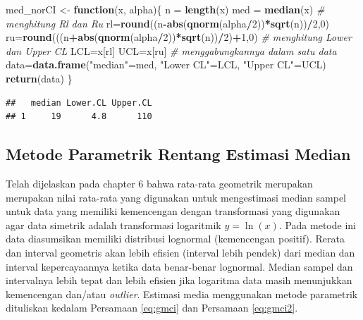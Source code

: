 \documentclass[]{book}
\newenvironment{Shaded}{\begin{snugshade}}{\end{snugshade}}
\newcommand{\KeywordTok}[1]{\textcolor[rgb]{0.13,0.29,0.53}{\textbf{#1}}}
\newcommand{\DataTypeTok}[1]{\textcolor[rgb]{0.13,0.29,0.53}{#1}}
\newcommand{\DecValTok}[1]{\textcolor[rgb]{0.00,0.00,0.81}{#1}}
\newcommand{\FloatTok}[1]{\textcolor[rgb]{0.00,0.00,0.81}{#1}}
\newcommand{\StringTok}[1]{\textcolor[rgb]{0.31,0.60,0.02}{#1}}
\newcommand{\CommentTok}[1]{\textcolor[rgb]{0.56,0.35,0.01}{\textit{#1}}}
\newcommand{\ControlFlowTok}[1]{\textcolor[rgb]{0.13,0.29,0.53}{\textbf{#1}}}
\newcommand{\OperatorTok}[1]{\textcolor[rgb]{0.81,0.36,0.00}{\textbf{#1}}}
\newcommand{\NormalTok}[1]{#1}
\begin{document}
\begin{Shaded}
\begin{Highlighting}[]
\NormalTok{med_norCI <-}\StringTok{ }\ControlFlowTok{function}\NormalTok{(x, alpha)\{}
\NormalTok{  n =}\StringTok{ }\KeywordTok{length}\NormalTok{(x)}
\NormalTok{  med =}\StringTok{ }\KeywordTok{median}\NormalTok{(x)}
  \CommentTok{# menghitung Rl dan Ru}
\NormalTok{  rl=}\KeywordTok{round}\NormalTok{((n}\OperatorTok{-}\KeywordTok{abs}\NormalTok{(}\KeywordTok{qnorm}\NormalTok{(alpha}\OperatorTok{/}\DecValTok{2}\NormalTok{))}\OperatorTok{*}\KeywordTok{sqrt}\NormalTok{(n))}\OperatorTok{/}\DecValTok{2}\NormalTok{,}\DecValTok{0}\NormalTok{)}
\NormalTok{  ru=}\KeywordTok{round}\NormalTok{(((n}\OperatorTok{+}\KeywordTok{abs}\NormalTok{(}\KeywordTok{qnorm}\NormalTok{(alpha}\OperatorTok{/}\DecValTok{2}\NormalTok{))}\OperatorTok{*}\KeywordTok{sqrt}\NormalTok{(n))}\OperatorTok{/}\DecValTok{2}\NormalTok{)}\OperatorTok{+}\DecValTok{1}\NormalTok{,}\DecValTok{0}\NormalTok{)}
  \CommentTok{# menghitung Lower dan Upper CL}
\NormalTok{  LCL=x[rl]}
\NormalTok{  UCL=x[ru]}
  \CommentTok{# menggabungkannya dalam satu data}
\NormalTok{  data=}\KeywordTok{data.frame}\NormalTok{(}\StringTok{"median"}\NormalTok{=med,}
                  \StringTok{"Lower CL"}\NormalTok{=LCL,}
                  \StringTok{"Upper CL"}\NormalTok{=UCL)}
  \KeywordTok{return}\NormalTok{(data)}
\NormalTok{\}}
\end{Highlighting}
\end{Shaded}

\begin{Shaded}
\end{Shaded}

\begin{verbatim}
##   median Lower.CL Upper.CL
## 1     19      4.8      110
\end{verbatim}

\subsection{Metode Parametrik Rentang Estimasi
Median}\label{metode-parametrik-rentang-estimasi-median}

Telah dijelaskan pada chapter 6 bahwa rata-rata geometrik merupakan
merupakan nilai rata-rata yang digunakan untuk mengestimasi median
sampel untuk data yang memiliki kemencengan dengan transformasi yang
digunakan agar data simetrik adalah transformasi logaritmik
\(y=\ln(x)\). Pada metode ini data diasumsikan memiliki distribusi
lognormal (kemencengan positif). Rerata dan interval geometris akan
lebih efisien (interval lebih pendek) dari median dan interval
kepercayaannya ketika data benar-benar lognormal. Median sampel dan
intervalnya lebih tepat dan lebih efisien jika logaritma data masih
menunjukkan kemencengan dan/atau \emph{outlier}. Estimasi media
menggunakan metode parametrik dituliskan kedalam Persamaan \eqref{eq:gmci}
dan Persamaan \eqref{eq:gmci2}.
\end{document}
